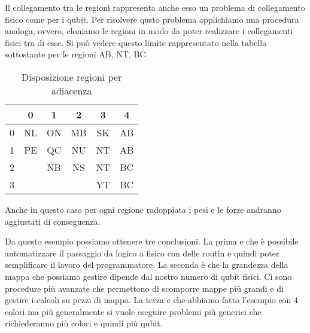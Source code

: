 Il collegamento tra le regioni rappresenta anche esso un problema di collegamento fisico come per i qubit. Per risolvere qusto problema applichiamo una procedura analoga, ovvero, cloniamo le regioni in modo da poter realizzare i collegamenti fisici tra di esse. Si può vedere questo limite rappresentato nella tabella sottostante per le regioni AB, NT, BC.
\begin{table}
  \begin{center}
    \begin{tabular}{ l | c | c | c | c | c }
        & 0  & 1  & 2  & 3  & 4  \\ \hline
      0 & NL & ON & MB & SK & AB \\
      1 & PE & QC & NU & NT & AB \\
      2 &    & NB & NS & NT & BC \\
      3 &    &    &    & YT & BC \\
    \end{tabular}
    \caption{Disposizione regioni per adiacenza}
  \end{center}
\end{table}
Anche in questo caso per ogni regione radoppiata i pesi e le forze andranno aggiustati di conseguenza.

Da questo esempio possiamo ottenere tre conclusioni. La prima e che è possibile automatizzare il passaggio da logico a fisico con delle routin e quindi poter semplificare il lavoro del programmatore. La seconda è che la grandezza della mappa che possiamo gestire dipende dal nostro numero di qubit fisici. Ci sono procedure più avanzate che permettono di scomporre mappe più grandi e di gestire i calcoli su pezzi di mappa. La terza e che abbiamo fatto l'esempio con 4 colori ma più generalmente si vuole eseguire problemi più generici che richiederanno più colori e quindi più qubit.

